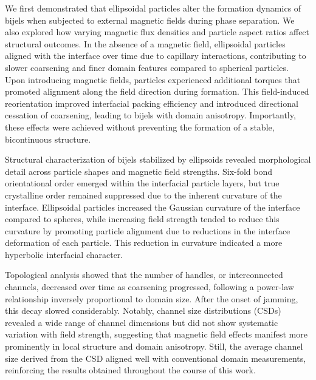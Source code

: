 We first demonstrated that ellipsoidal particles alter the formation dynamics of bijels when subjected to external magnetic 
fields during phase separation. We also explored how varying magnetic flux densities and particle aspect ratios affect structural outcomes. 
In the absence of a magnetic field, ellipsoidal particles 
aligned with the interface over time due to capillary interactions, contributing to slower coarsening and finer domain features compared 
to spherical particles. Upon introducing magnetic fields, particles experienced additional torques that promoted alignment along the field 
direction during formation. This field-induced reorientation improved interfacial packing efficiency and introduced directional cessation
of coarsening, leading to bijels with domain anisotropy. Importantly, these effects were achieved without preventing the formation of a 
stable, bicontinuous structure.

Structural characterization of bijels stabilized by ellipsoids revealed morphological detail across particle shapes and magnetic field strengths. 
Six-fold bond orientational order emerged within the interfacial particle layers, but true crystalline order remained suppressed due to the 
inherent curvature of the interface. Ellipsoidal particles increased the Gaussian curvature of the interface compared 
to spheres, while increasing field strength tended to reduce this curvature by promoting particle alignment due to reductions in the interface
deformation of each particle. This reduction in curvature indicated a more hyperbolic interfacial character.

Topological analysis showed that the number of handles, or interconnected channels, decreased over time as coarsening progressed, following 
a power-law relationship inversely proportional to domain size. After the onset of jamming, this decay slowed considerably. Notably, 
channel size distributions (CSDs) revealed a wide range of channel dimensions but did not show systematic variation with 
field strength, suggesting that magnetic field effects manifest more prominently in local structure and domain anisotropy. Still, the 
average channel size derived from the CSD aligned well with conventional domain measurements, reinforcing the results obtained throughout
the course of this work.

